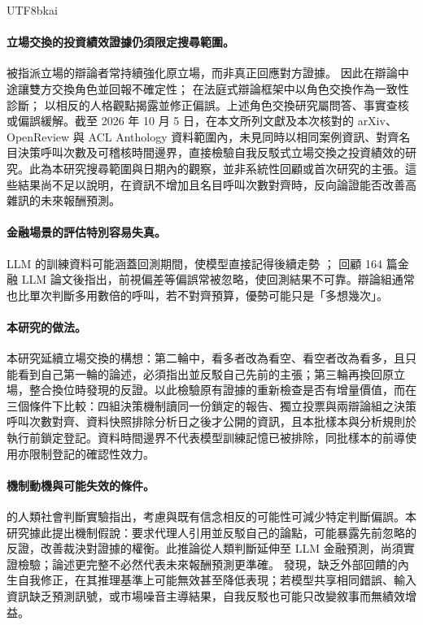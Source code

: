 \documentclass[12pt,a4paper]{article}
\begin{document}
\begin{CJK}{UTF8}{bkai}
\paragraph{立場交換的投資績效證據仍須限定搜尋範圍。}
被指派立場的辯論者常持續強化原立場，而非真正回應對方證據。\citet{liu2025roleswitch} 因此在辯論中途讓雙方交換角色並回報不確定性；\citet{chowdhury2026proclaim} 在法庭式辯論框架中以角色交換作為一致性診斷；\citet{chen2026mpt} 以相反的人格觀點揭露並修正偏誤。上述角色交換研究屬問答、事實查核或偏誤緩解。截至 2026 年 10 月 5 日，在本文所列文獻及本次核對的 arXiv、OpenReview 與 ACL Anthology 資料範圍內，未見同時以相同案例資訊、對齊名目決策呼叫次數及可稽核時間邊界，直接檢驗自我反駁式立場交換之投資績效的研究。此為本研究搜尋範圍與日期內的觀察，並非系統性回顧或首次研究的主張。這些結果尚不足以說明，在資訊不增加且名目呼叫次數對齊時，反向論證能否改善高雜訊的未來報酬預測。

\paragraph{金融場景的評估特別容易失真。}
LLM 的訓練資料可能涵蓋回測期間，使模型直接記得後續走勢 \citep{glasserman2023lookahead}；\citet{kong2026bias} 回顧 164 篇金融 LLM 論文後指出，前視偏差等偏誤常被忽略，使回測結果不可靠。辯論組通常也比單次判斷多用數倍的呼叫，若不對齊預算，優勢可能只是「多想幾次」。

\paragraph{本研究的做法。}
本研究延續立場交換的構想：第二輪中，看多者改為看空、看空者改為看多，且只能看到自己第一輪的論述，必須指出並反駁自己先前的主張；第三輪再換回原立場，整合換位時發現的反證。以此檢驗原有證據的重新檢查是否有增量價值，而在三個條件下比較：四組決策機制讀同一份鎖定的報告、獨立投票與兩辯論組之決策呼叫次數對齊、資料快照排除分析日之後才公開的資訊，且本批樣本與分析規則於執行前鎖定登記。資料時間邊界不代表模型訓練記憶已被排除，同批樣本的前導使用亦限制登記的確認性效力。

\paragraph{機制動機與可能失效的條件。}
\citet{lord1984opposite} 的人類社會判斷實驗指出，考慮與既有信念相反的可能性可減少特定判斷偏誤。本研究據此提出機制假說：要求代理人引用並反駁自己的論點，可能暴露先前忽略的反證，改善裁決對證據的權衡。此推論從人類判斷延伸至 LLM 金融預測，尚須實證檢驗；論述更完整不必然代表未來報酬預測更準確。\citet{huang2024selfcorrect} 發現，缺乏外部回饋的內生自我修正，在其推理基準上可能無效甚至降低表現；若模型共享相同錯誤、輸入資訊缺乏預測訊號，或市場噪音主導結果，自我反駁也可能只改變敘事而無績效增益。


\end{CJK}
\end{document}
